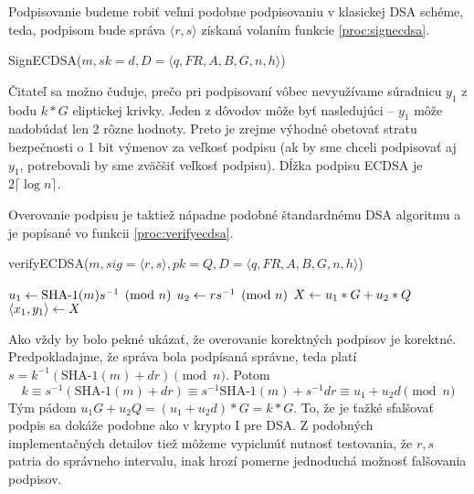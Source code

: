 Podpisovanie budeme robiť veľmi podobne podpisovaniu v klasickej DSA
schéme, teda, podpisom bude správa $\langle r,s \rangle$ získaná 
volaním funkcie \ref{proc:signecdsa}.

\begin{procedure}[H]
    \caption{SignECDSA($m,sk=d, D=\langle q,FR, A,B,G,n,h \rangle$)}
    \label{proc:signecdsa}
    \;
\end{procedure}

Čitateľ sa možno čuduje, prečo pri podpisovaní vôbec nevyužívame
súradnicu $y_1$ z bodu $k*G$ eliptickej krivky. Jeden z dôvodov môže
byť nasledujúci -- $y_1$ môže nadobúdať len 2 rôzne hodnoty. Preto
je zrejme výhodné obetovať stratu bezpečnosti o 1 bit výmenov za veľkosť
podpisu (ak by sme chceli podpisovať aj $y_1$, potrebovali by sme
zväčšiť veľkosť podpisu). Dĺžka podpisu ECDSA je $2 \lceil \log n \rceil$.

Overovanie podpisu je taktiež nápadne podobné štandardnému DSA
algoritmu a je popísané vo funkcii \ref{proc:verifyecdsa}.

\begin{procedure}[H]
    \caption{verifyECDSA($m,sig=\langle r,s \rangle,pk= Q,
            D=\langle q,FR, A,B,G,n,h \rangle$)}
    \label{proc:verifyecdsa}
    \;
    $u_1 \leftarrow \mbox{SHA-1}(m) s^{-1}\pmod{n}$ \;
    $u_2 \leftarrow r s^{-1} \pmod{n}$ \;
    $X \leftarrow u_1 * G + u_2 * Q$ \;
    $ \langle x_1, y_1 \rangle \leftarrow X$ \;
\end{procedure}

Ako vždy by bolo pekné ukázať, že overovanie korektných podpisov
je korektné.
Predpokladajme, že správa bola podpísaná správne, teda platí
$s = k^{-1} (\mbox{SHA-1}(m) + d r) \pmod{n}$.
Potom 
\begin{equation*}
    k \equiv s^{-1} (\mbox{SHA-1}(m) + d r)  \equiv
    s^{-1} \mbox{SHA-1}(m) + s^{-1} d r \equiv u_1 + u_2 d \pmod{n}
\end{equation*}
Tým pádom $u_1 G + u_2 Q = (u_1 + u_2 d)*G = k*G$.
To, že je ťažké sfalšovať podpis sa dokáže podobne ako v krypto I pre
DSA. Z podobných implementačných detailov tiež môžeme vypichnúť
nutnosť testovania,
že $r,s$ patria do správneho intervalu, inak hrozí pomerne jednoduchá
možnosť falšovania podpisov.

